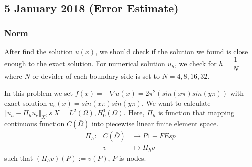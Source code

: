 \documentclass[a4paper,10pt]{article}
\begin{document}
\subsection{5 January 2018 (Error Estimate)}
\subsubsection{Norm}
After find the solution $ u(x) $, we should check if the solution we found is close enough to the exact solution. For numerical solution $ u_{h} $, we check for $ h = \dfrac{1}{N} $ where $ N $  or devider of each boundary side is set to $ N = 4,8,16,32 $.

In this problem we set $ f(x) = -\nabla u(x) = 2 \pi^2(sin(x\pi)sin(y\pi))$ with exact solution $ u_{e}(x) = sin(x\pi)sin(y\pi) $. We want to calculate $ \Vert u_{h}-\Pi_{h}u_{e} \Vert_{X} ,s \ X = L^2(\Omega), H_{0}^{1}(\Omega)$. Here, $ \Pi_{h} $ is function that mapping continuous function $ C(\bar{\Omega}) $ into piecewise linear finite element space.
\begin{eqnarray}\nonumber
\Pi_{h} : & C(\bar{\Omega}) & \rightarrow P1-FEsp \\ \nonumber
& v & \mapsto \Pi_{h}v
\end{eqnarray}
such that $ (\Pi_{h}v)(P) := v(P) $, $ P $ is nodes.
\end{document}
